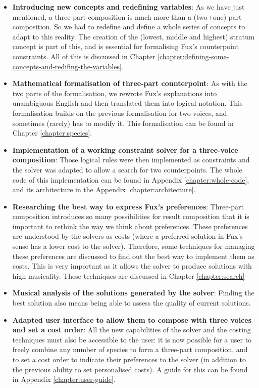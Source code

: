 \begin{itemize}
    \item \textbf{Introducing new concepts and redefining variables}:
    As we have just mentioned, a three-part composition is much more than a (two+one) part composition. So we had to redefine and define a whole series of concepts to adapt to this reality. The creation of the (lowest, middle and highest) stratum concept is part of this, and is essential for formalising Fux's counterpoint constraints. All of this is discussed in Chapter \ref{chapter:defining-some-concepts-and-redifing-the-variables}.
    \item \textbf{Mathematical formalisation of three-part counterpoint}: As with the two parts of the formalisation, we rewrote Fux's explanations into unambiguous English and then translated them into logical notation. This formalisation builds on the previous formalisation for two voices, and sometimes (rarely) has to modify it. This formalisation can be found in Chapter \ref{chapter:species}.
    \item \textbf{Implementation of a working constraint solver for a three-voice composition}: Those logical rules were then implemented as constraints and the solver was adapted to allow a search for two counterpoints. The whole code of this implementation can be found in Appendix \ref{chapter:whole-code}, and its architecture in the Appendix \ref{chapter:architecture}.
    \item \textbf{Researching the best way to express Fux's preferences}: Three-part composition introduces so many possibilities for result composition that it is important to rethink the way we think about preferences. These preferences are understood by the solvers as costs (where a preferred solution in Fux's sense has a lower cost to the solver). Therefore, some techniques for managing these preferences are discussed to find out the best way to implement them as costs. This is very important as it allows the solver to produce solutions with high musicality. These techniques are discussed in Chapter \ref{chapter:search}
    \item \textbf{Musical analysis of the solutions generated by the solver}: Finding the best solution also means being able to assess the quality of current solutions. %
    \item \textbf{Adapted user interface to allow them to compose with three voices and set a cost order}: All the new capabilities of the solver and the costing techniques must also be accessible to the user: it is now possible for a user to freely combine any number of species to form a three-part composition, and to set a cost order to indicate their preferences to the solver (in addition to the previous ability to set personalised costs). A guide for this can be found in Appendix \ref{chapter:user-guide}.
\end{itemize}
